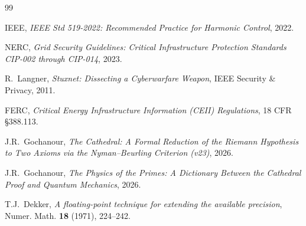 \documentclass[11pt,a4paper]{article}
\begin{document}
\vspace{0.5cm}

\begin{thebibliography}{99}

IEEE, \emph{IEEE Std 519-2022: Recommended Practice for Harmonic
Control}, 2022.

NERC, \emph{Grid Security Guidelines: Critical Infrastructure
Protection Standards CIP-002 through CIP-014}, 2023.

R.~Langner, \emph{Stuxnet: Dissecting a Cyberwarfare Weapon},
IEEE Security \& Privacy, 2011.

FERC, \emph{Critical Energy Infrastructure Information (CEII)
Regulations}, 18 CFR \S 388.113.

J.R.~Gochanour, \emph{The Cathedral: A Formal Reduction of the
Riemann Hypothesis to Two Axioms via the Nyman--Beurling
Criterion (v23)}, 2026.

J.R.~Gochanour, \emph{The Physics of the Primes: A Dictionary
Between the Cathedral Proof and Quantum Mechanics}, 2026.

T.J.~Dekker, \emph{A floating-point technique for extending the
available precision}, Numer. Math. \textbf{18} (1971), 224--242.

\end{thebibliography}
\end{document}
